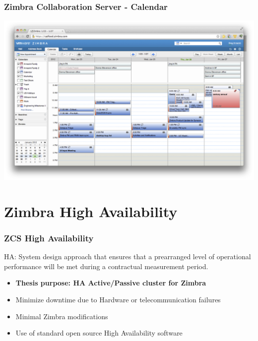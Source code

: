 \documentclass[10pt]{beamer}
\begin{document}
\begin{frame}
\frametitle{Zimbra Collaboration Server - Calendar}

\begin{center}
  \includegraphics[scale=0.4,keepaspectratio=true]{./img/zimbra-calendar.jpg}
\end{center}


\end{frame}
\section {Zimbra High Availability}
\begin{frame}
\frametitle{ZCS High Availability}


\begin{block}{}
HA: System design approach that ensures that a prearranged level of operational performance will be met during a contractual measurement period.
\end{block}


\quad

\begin{itemize}

\item \textbf{Thesis purpose: HA Active/Passive cluster for Zimbra}
\item Minimize downtime due to Hardware or telecommunication failures
\item Minimal Zimbra modifications
\item Use of standard open source High Availability software

\end{itemize}

\end{frame}
\end{document}
